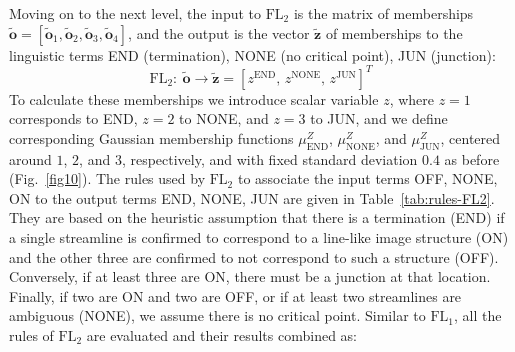 Moving on to the next level, the input to $\mathrm{FL}_{2}$ is the matrix of memberships $\tilde{\mathbf{o}}=\left[\tilde{\mathbf{o}}_{1},\tilde{\mathbf{o}}_{2},\tilde{\mathbf{o}}_{3},\tilde{\mathbf{o}}_{4}\right]$, and the output is the vector $\tilde{\mathbf{z}}$ of memberships to the linguistic terms END (termination), NONE (no critical point), JUN (junction):
\begin{equation}
\mathrm{FL}_{2}\!:\ \tilde{\mathbf{o}} \rightarrow \tilde{\mathbf{z}} = \left[z^{\textrm{END}}\!,\, z^{\textrm{NONE}}\!,\, z^{\textrm{JUN}}\right]^T
\label{eq:FL2}
\end{equation}
To calculate these memberships we introduce scalar variable $z$, where $z=1$ corresponds to END, $z=2$ to NONE, and $z=3$ to JUN, and we define corresponding Gaussian membership functions $\mu_{\textrm{END}}^{Z}$, $\mu_{\textrm{NONE}}^{Z}$, and $\mu_{\textrm{JUN}}^{Z}$, centered around $1$, $2$, and $3$, respectively, and with fixed standard deviation $0.4$ as before (Fig.~\ref{fig10}). The rules used by $\mathrm{FL}_{2}$ to associate the input terms OFF, NONE, ON to the output terms END, NONE, JUN are given in Table~\ref{tab:rules-FL2}. They are based on the heuristic assumption that there is a termination (END) if a single streamline is confirmed to correspond to a line-like image structure (ON) and the other three are confirmed to not correspond to such a structure (OFF). Conversely, if at least three are ON, there must be a junction at that location. Finally, if two are ON and two are OFF, or if at least two streamlines are ambiguous (NONE), we assume there is no critical point. Similar to $\mathrm{FL}_{1}$, all the rules of $\mathrm{FL}_{2}$ are evaluated and their results combined as:

